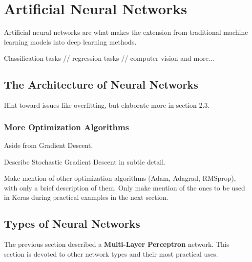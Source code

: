 \chapter{Artificial Neural Networks}

Artificial neural networks are what makes the extension from traditional machine learning models into deep learning methods.

Classification tasks // regression tasks // computer vision and more...

\section{The Architecture of Neural Networks} %

Hint toward issues like overfitting, but elaborate more in section 2.3.

  





\subsection{More Optimization Algorithms}

Aside from Gradient Descent.

Describe Stochastic Gradient Descent in subtle detail.

Make mention of other optimization algorithms (Adam, Adagrad, RMSprop), with only a brief description of them.  Only make mention of the ones to be used in Keras during practical examples in the next section.

\section{Types of Neural Networks} %
The previous section described a \textbf{Multi-Layer Perceptron} network.  This section is devoted to other network types and their most practical uses. 

